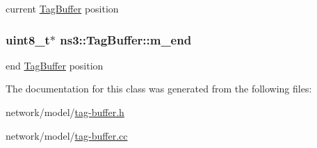 current \hyperlink{classns3_1_1TagBuffer}{Tag\+Buffer} position 

\subsubsection[{\texorpdfstring{m\+\_\+end}{m_end}}]{\setlength{\rightskip}{0pt plus 5cm}uint8\+\_\+t$\ast$ ns3\+::\+Tag\+Buffer\+::m\+\_\+end\hspace{0.3cm}{\ttfamily [private]}}\hypertarget{classns3_1_1TagBuffer_ad68c99370c0cfb1337dfba17ae8ffecf}{}\label{classns3_1_1TagBuffer_ad68c99370c0cfb1337dfba17ae8ffecf}


end \hyperlink{classns3_1_1TagBuffer}{Tag\+Buffer} position 



The documentation for this class was generated from the following files\+:\begin{DoxyCompactItemize}
\item 
network/model/\hyperlink{tag-buffer_8h}{tag-\/buffer.\+h}\item 
network/model/\hyperlink{tag-buffer_8cc}{tag-\/buffer.\+cc}\end{DoxyCompactItemize}

